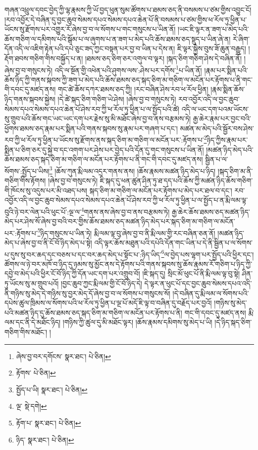 གཞན་འཕྲུལ་དབང་བྱེད་ཀྱི་ལྷ་རྣམས་ཀྱི་ཡོ་བྱད་ཕུན་སུམ་ཚོགས་པ་ཐམས་ཅད་ནི་བསམས་པ་ཙམ་གྱིས་འབྱུང་ངོ། །རབ་འབྱོར་དེ་བཞིན་དུ་བྱང་ཆུབ་སེམས་དཔའ་སེམས་དཔའ་ཆེན་པོ་ནི་བསམས་པ་ཙམ་གྱིས་ཕ་རོལ་ཏུ་ཕྱིན་པ་ཡོངས་སུ་རྫོགས་པར་འགྱུར་རོ་ཞེས་བྱ་བ་ལ་སོགས་པ་གང་གསུངས་པ་ཡིན་ནོ། །ཡང་ཇི་ལྟར་ན་ཟག་པ་མེད་པའི་ཆོས་གཅིག་ལ་དམིགས་པའི་སྒོམ་པ་ལ་ཞུགས་པ་ན་ཟག་པ་མེད་པའི་ཆོས་ཐམས་ཅད་སྡུད་པ་ཡིན་ཞེ་ན། རེ་ཞིག་དོན་འདི་ལ་འཇིག་རྟེན་པའི་དཔེ་ཅུང་ཟད་ཀྱང་བསྟན་པར་བྱ་བ་ཡིན་པ་དེས་ན། ཇི་ལྟར་སྐྱེས་བུས་ཟོ་ཆུན་བརྒྱུད། །རྡོག་ཐབས་གཅིག་གིས་བསྐྱོད་པ་ན། །ཐམས་ཅད་ཅིག་ཅར་འགུལ་བ་ལྟར། །སྐད་ཅིག་གཅིག་ཤེས་དེ་བཞིན་ནོ། །ཞེས་བྱ་བ་གསུངས་ཏེ། འདི་ལ་སྔོན་གྱི་འཕེན་པའི་ཤུགས་ལས་:ཤེས་པར་དགོས་\footnote{ཞེས་བྱ་བར་དགོངས་  སྣར་ཐང་།  པེ་ཅིན། }པ་ཡིན་ནོ། །རྣམ་པར་སྨིན་པའི་ཆོས་ཉིད་ཀྱི་གནས་སྐབས་ཀྱི་ཟག་པ་མེད་པའི་ཆོས་ཐམས་ཅད་སྐད་ཅིག་མ་གཅིག་ལ་མངོན་པར་རྟོགས་པ་ནི་གང་གི་དབང་དུ་མཛད་ནས། གང་ཚེ་ཆོས་དཀར་ཐམས་ཅད་ཀྱི། །རང་བཞིན་ཤེས་རབ་ཕ་རོལ་ཕྱིན། །རྣམ་སྨིན་ཆོས་ཉིད་གནས་སྐབས་སྐྱེས། །དེ་ཚེ་སྐད་ཅིག་གཅིག་ཡེ་ཤེས། །ཞེས་བྱ་བ་གསུངས་ཏེ། རབ་འབྱོར་འདི་ལ་བྱང་ཆུབ་སེམས་དཔའ་སེམས་དཔའ་ཆེན་པོ་ཤེས་རབ་ཀྱི་ཕ་རོལ་ཏུ་ཕྱིན་པ་ལ་སྤྱོད་པའི་ཚེ། འདི་ལ་ཡང་དག་པའམ་ཡོངས་སུ་གྲུབ་པའི་ཆོས་གང་ཡང་ཡང་དག་པར་རྗེས་སུ་མི་མཐོང་ཞེས་བྱ་བ་ནས་བརྩམས་ཏེ། རྒྱ་ཆེར་རྣམ་པར་བྱང་བའི་ཕྱོགས་ཐམས་ཅད་རྣམ་པར་སྨིན་པའི་གནས་སྐབས་སུ་རྣམ་པར་གཞག་པ་དང་། མཚན་མ་མེད་པའི་སྦྱོར་བས་ཤེས་རབ་ཀྱི་ཕ་རོལ་ཏུ་ཕྱིན་པ་ཡོངས་སུ་རྫོགས་ནས་སྐད་ཅིག་མ་གཅིག་ལ་མངོན་པར་:རྟོགས་པ་\footnote{རྟོགས་  པེ་ཅིན། }ཉིད་ཀྱིས་རྣམ་པར་སྨིན་པ་ཅིག་ཅར་དུ་སྐྱེ་བ་དང་འགག་པར་ཤེས་པར་བྱེད་པའི་དོན་དུ་གང་གསུངས་པ་ཡིན་ནོ། །མཚན་ཉིད་མེད་པའི་ཆོས་ཐམས་ཅད་སྐད་ཅིག་མ་གཅིག་ལ་མངོན་པར་རྟོགས་པ་ནི་གང་གི་དབང་དུ་མཛད་ནས། སྦྱིན་པ་ལ་སོགས་:སྤྱོད་པ་ཡིས།\footnote{སྤྱོད་པ་ཡི།  སྣར་ཐང་།  པེ་ཅིན། } །ཆོས་ཀུན་རྨི་ལམ་འདྲར་གནས་ནས། །ཆོས་རྣམས་མཚན་ཉིད་མེད་པ་ཉིད། །སྐད་ཅིག་མ་ནི་གཅིག་གིས་རྟོགས། །ཞེས་བྱ་བ་གསུངས་ཏེ། ཇི་སྐད་དུ་ཕན་ཚུན་ཤིན་ཏུ་ཐ་དད་པའི་ཆོས་ཀྱི་མཚན་ཉིད་ཆོས་གཅིག་གི་ཁོངས་སུ་འདུས་པར་མི་འཐད་པས། སྐད་ཅིག་མ་གཅིག་ལ་མངོན་པར་རྟོགས་པ་མེད་པར་ཐལ་བ་དང་། རབ་འབྱོར་འདི་ལ་བྱང་ཆུབ་སེམས་དཔའ་སེམས་དཔའ་ཆེན་པོ་ཤེས་རབ་ཀྱི་ཕ་རོལ་ཏུ་ཕྱིན་པ་ལ་སྤྱོད་པ་ན་རྨི་ལམ་ལྟ་བུའི་ཉེ་བར་ལེན་པའི་ཕུང་པོ་:ལྔ་ལ་\footnote{ལྔ་  སྡེ་དགེ། }གནས་ནས་ཞེས་བྱ་བ་ནས་བརྩམས་ཏེ། རྒྱ་ཆེར་ཆོས་ཐམས་ཅད་མཚན་ཉིད་མེད་པར་ཤེས་སོ་ཞེས་བྱ་བའི་བར་གྱིས་ཆོས་ཐམས་ཅད་མཚན་ཉིད་མེད་པར་སྐད་ཅིག་མ་གཅིག་ལ་མངོན་པར་:རྟོགས་པ་\footnote{རྟོག་པ་  སྣར་ཐང་།  པེ་ཅིན། }ཉིད་གསུངས་པ་ཡིན་ཏེ། རྨི་ལམ་ལྟ་བུ་ཞེས་བྱ་བ་ནི་རྨི་ལམ་གྱི་རང་བཞིན་ཅན་ནོ། །མཚན་ཉིད་མེད་པ་ཞེས་བྱ་བ་ནི་ངོ་བོ་ཉིད་མེད་པ་སྟེ། འདི་ལྟར་ཆོས་མཐུན་པའི་དཔེའི་དོན་གང་ཡིན་པ་དེ་ནི་སྦྱིན་པ་ལ་སོགས་པ་དུས་སུ་བར་ཆད་དང་བཅས་པ་དང་བར་ཆད་མེད་པ་སྟོང་པ་:ཉིད་ཡིད་\footnote{ཉིད་  སྣར་ཐང་།  པེ་ཅིན། }ལ་བྱེད་པས་ལྷག་པར་སྤྱོད་པའི་ཕྱིར་དང་། ཚོགས་ལ་ཉེ་བར་མཁོ་བ་ཉིད་དུ་ཉམས་སུ་མྱོང་ནས་དེ་རྟོགས་པའི་གནས་སྐབས་སུ་ཆོས་རྣམས་རོ་གཅིག་པ་ཉིད་ཀྱི་དབྱེ་བ་མེད་པའི་ཕྱིར་ངོ་བོ་ཉིད་ཀྱི་དོན་ཡང་དག་པར་འགྲུབ་བོ། །ཇི་སྐད་དུ། སྲིང་མོ་ཕུང་པོ་ནི་རྨི་ལམ་ལྟ་བུ་སྟེ། ཤིན་ཏུ་ཡོངས་སུ་མ་གྲུབ་པའོ། །བྱང་ཆུབ་ཀྱང་རྨི་ལམ་གྱི་ངོ་བོ་ཉིད་དེ། དེ་ལྟར་ན་ཕུང་པོ་དང་བྱང་ཆུབ་སེམས་དཔའ་འདི་ནི་གཉིས་སུ་མེད་དེ་གཉིས་སུ་བྱར་མེད་དོ་ཞེས་བྱ་བ་ལ་སོགས་པ་གསུངས་སོ། །དེ་བཞིན་དུ་རྨི་ལམ་ལ་སོགས་པའི་དཔེས་ཚུལ་ཁྲིམས་ལ་སོགས་པའི་ཕ་རོལ་ཏུ་ཕྱིན་པ་ལྔ་པོ་མདོ་ཇི་ལྟ་བ་བཞིན་དུ་བརྗོད་པར་བྱའོ། །གཉིས་སུ་མེད་པའི་མཚན་ཉིད་དུ་ཆོས་ཐམས་ཅད་སྐད་ཅིག་མ་གཅིག་ལ་མངོན་པར་རྟོགས་པ་ནི། གང་གི་དབང་དུ་མཛད་ནས། རྨི་ལམ་དང་ནི་དེ་མཐོང་ཉིད། །གཉིས་ཀྱི་ཚུལ་དུ་མི་མཐོང་ལྟར། །ཆོས་རྣམས་དམིགས་སུ་མེད་པ་ཡི། །དེ་ཉིད་སྐད་ཅིག་གཅིག་གིས་མཐོང་། །
